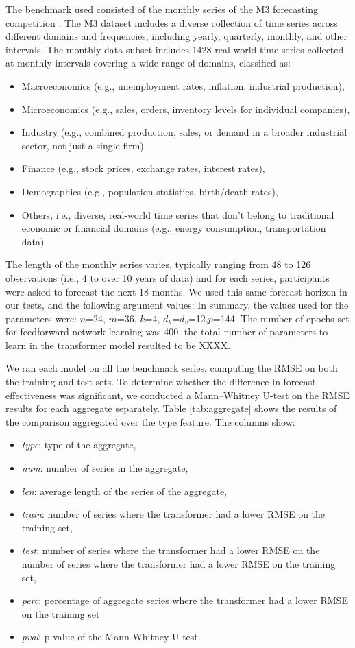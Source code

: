 \documentclass[algorithms,article,submit,pdftex,moreauthors]{Definitions/mdpi}
\begin{document}
The benchmark used consisted of the monthly series of the M3 forecasting competition \cite{MH00}. The M3 dataset includes a diverse collection of time series across different domains and frequencies, including yearly, quarterly, monthly, and other intervals. The monthly data subset includes 1428 real world time series collected at monthly intervals covering a wide range of domains, classified as:
\begin{itemize}
	\item Macroeconomics (e.g., unemployment rates, inflation, industrial production),
	\item Microeconomics (e.g., sales, orders, inventory levels for individual companies),
	\item Industry (e.g., combined production, sales, or demand in a broader industrial sector, not just a single firm)
	\item Finance (e.g., stock prices, exchange rates, interest rates),
	\item Demographics (e.g., population statistics, birth/death rates),
	\item Others, i.e., diverse, real-world time series that don’t belong to traditional economic or financial domains (e.g., energy consumption, transportation data)
\end{itemize}

The length of the monthly series varies, typically ranging from 48 to 126 observations (i.e., 4 to over 10 years of data) and for each series, participants were asked to forecast the next 18 months. We used this same forecast horizon in our tests, and the following argument values: In summary, the values used for the parameters were: $n$=24, $m$=36, $k$=4, $d_k$=$d_v$=12,$p$=144. The number of epochs set for feedforward network learning was 400, the total number of parameters to learn in the transformer model resulted to be XXXX.

We ran each model on all the benchmark series, computing the RMSE on both the training and test sets. To determine whether the difference in forecast effectiveness was significant, we conducted a Mann–Whitney U-test on the RMSE results for each aggregate separately. Table \ref{tab:aggregate} shows the results of the comparison aggregated over the type feature. The columns show:
\begin{itemize}
	\item {\it type}: type of the aggregate,
	\item {\it num}: number of series in the aggregate,
	\item {\it len}: average length of the series of the aggregate,
	\item {\it train}: number of series where the transformer had a lower RMSE on the training set,
	\item {\it test}: number of series where the transformer had a lower RMSE on the number of series where the transformer had a lower RMSE on the training set,
	\item {\it perc}: percentage of aggregate series where the transformer had a lower RMSE on the training set
	\item {\it pval}: p value of the Mann-Whitney U test.
\end{itemize}
\end{document}
